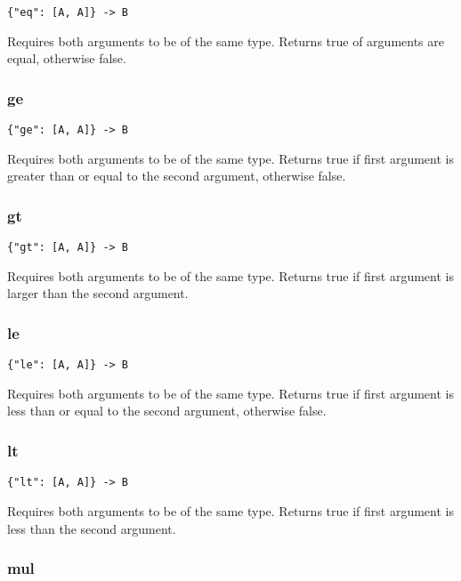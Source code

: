 \documentclass[a4paper]{article}
\begin{document}
\begin{verbatim}
{"eq": [A, A]} -> B
\end{verbatim}

Requires both arguments to be of the same type. Returns true of
arguments are equal, otherwise false.

\subsubsection{ge}

\begin{verbatim}
{"ge": [A, A]} -> B
\end{verbatim}

Requires both arguments to be of the same type. Returns true if first
argument is greater than or equal to the second argument, otherwise
false.

\subsubsection{gt}

\begin{verbatim}
{"gt": [A, A]} -> B
\end{verbatim}

Requires both arguments to be of the same type. Returns true if first
argument is larger than the second argument.

\subsubsection{le}

\begin{verbatim}
{"le": [A, A]} -> B
\end{verbatim}

Requires both arguments to be of the same type. Returns true if first
argument is less than or equal to the second argument, otherwise
false.

\subsubsection{lt}

\begin{verbatim}
{"lt": [A, A]} -> B
\end{verbatim}

Requires both arguments to be of the same type. Returns true if first
argument is less than the second argument.

\subsubsection{mul}
\end{document}
